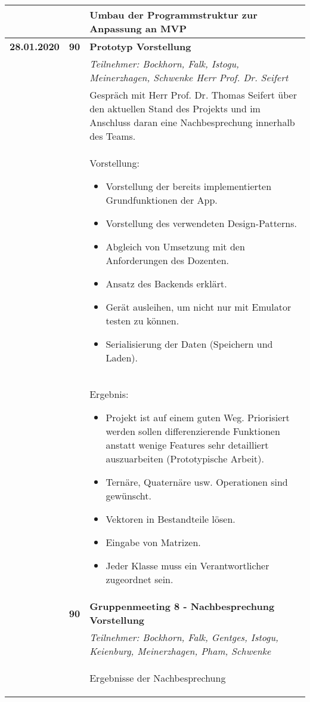 {{\begin{longtable}{|l|l|p{11cm}|}
			\\ & &
			Umbau der Programmstruktur zur Anpassung an MVP
	\\ \hline
		\textbf{28.01.2020} 
			& \textbf{\hfill90} & \textbf{Prototyp Vorstellung}
			\\ & &
			\small{\textit{Teilnehmer: Bockhorn, Falk, Istogu, Meinerzhagen, Schwenke Herr Prof. Dr. Seifert}}
			\\ & &
			Gespräch mit Herr Prof. Dr. Thomas Seifert über den aktuellen Stand des Projekts und im Anschluss daran eine Nachbesprechung innerhalb des Teams.
			\\ & &
			Vorstellung:
			\begin{itemize}\renewcommand\labelitemi{--}
				\item Vorstellung der bereits implementierten Grundfunktionen der App.
				\item Vorstellung des verwendeten Design-Patterns.
				\item Abgleich von Umsetzung mit den Anforderungen des Dozenten.
				\item Ansatz des Backends erklärt.
				\item Gerät ausleihen, um nicht nur mit Emulator testen zu können.
				\item Serialisierung der Daten (Speichern und Laden).
			\end{itemize}
			\\ & &
			Ergebnis:
			\begin{itemize}\renewcommand\labelitemi{--}
				\item Projekt ist auf einem guten Weg. Priorisiert werden sollen differenzierende Funktionen anstatt wenige Features sehr detailliert auszuarbeiten (Prototypische Arbeit).
				\item Ternäre, Quaternäre usw. Operationen sind gewünscht.
				\item Vektoren in Bestandteile lösen.
				\item Eingabe von Matrizen.
				\item Jeder Klasse muss ein Verantwortlicher zugeordnet sein.
			\end{itemize}		
		\\ \cline{2-3}
		& \textbf{\hfill90} & \textbf{Gruppenmeeting 8 - Nachbesprechung Vorstellung}
			\\ & &
			\small{\textit{Teilnehmer: Bockhorn, Falk, Gentges, Istogu, Keienburg, Meinerzhagen, Pham, Schwenke}}
			\\ & &
			Ergebnisse der Nachbesprechung
			\begin{itemize}\renewcommand\labelitemi{--}

\end{itemize}
\end{longtable}}}

